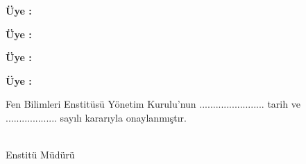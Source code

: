 \documentclass[]{esogu}			%
\makeatletter
\newcommand{\AtBeginShipoutClear}{\gdef\AtBegShi@Hook{}}
\makeatother
\begin{document}
\noindent \textbf{Üye :\space}\jiki

\noindent \textbf{Üye :\space}\juc

\noindent \textbf{Üye :\space}\jdort

\noindent \textbf{Üye :\space}\jbes

\vspace{15mm}

\begin{framed}
Fen Bilimleri Enstitüsü Yönetim Kurulu'nun ........................ tarih ve  \space \space \space \space \space\\................... sayılı kararıyla onaylanmıştır. 
\newline
\newline
\begin{flushright}
\mudur \\
Enstitü Müdürü\space \space \space \space \space \space \space \space \space \space \space \space \space \space %
\end{flushright}

\end{framed}


\renewcommand{\listfigurename}{ŞEKİLLER DİZİNİ}
\renewcommand{\listtablename}{ÇİZELGELER DİZİNİ}

\setlength\beforechapskip{-\baselineskip}


\normalsize

\clearpage





\tableofcontents*
\AtBeginShipoutClear
\newpage
{}
\listoffigures
\AtBeginShipoutClear
\newpage
{}
\listoftables
\AtBeginShipoutClear
\clearpage

\clearpage
\printglossary[style=mylong3col, type=\acronymtype, title=Simgeler ve Kısaltmalar Dizini, toctitle=SİMGELER VE KISALTMALAR DİZİNİ]
\clearpage
\renewcommand{\listtheoremname}{TEOREMLER LİSTESİ}
\listoftheorems[ignoreall,onlynamed={theorem}]
\clearpage
\renewcommand{\listtheoremname}{İSPATLAR LİSTESİ}
\listoftheorems[ignoreall, show={ispat}]
\clearpage
\end{document}
